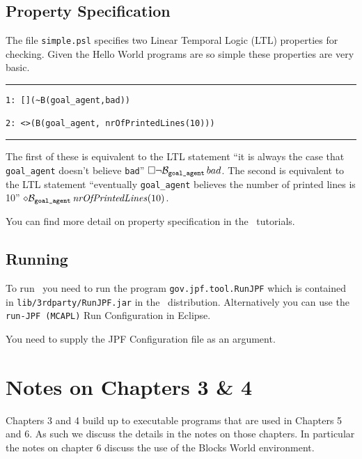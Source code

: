 \subsection{Property Specification}
The file \texttt{simple.psl} specifies two Linear Temporal Logic (LTL) properties for checking.  Given the Hello World programs are so simple these properties are very basic.  

\noindent\rule{\textwidth}{1pt}
\begin{small}
\begin{verbatim}
1: [](~B(goal_agent,bad))

2: <>(B(goal_agent, nrOfPrintedLines(10)))
\end{verbatim}
\end{small}
\rule{\textwidth}{1pt}

The first of these is equivalent to the LTL statement ``it is always the case that \texttt{goal\_agent} doesn't believe \texttt{bad}'' $\Box \neg \mathrm{{\cal B}}_{\texttt{goal\_agent}} \, bad$.  The second is equivalent to the LTL statement ``eventually \texttt{goal\_agent} believes the number of printed lines is 10'' $\diamond \mathrm{{\cal B}}_{\texttt{goal\_agent}} \, \mathit{nrOfPrintedLines}(10)$.

You can find more detail on property specification in the \ajpf\ tutorials.

\subsection{Running \ajpf}
To run \ajpf\ you need to run the program \texttt{gov.jpf.tool.RunJPF} which is contained in \texttt{lib/3rdparty/RunJPF.jar} in the \mcapl\ distribution.  Alternatively you can use the \texttt{run-JPF (MCAPL)} Run Configuration in Eclipse.

You need to supply the JPF Configuration file as an argument.  

\section{Notes on Chapters 3 \& 4}

Chapters 3 and 4 build up to executable programs that are used in Chapters 5 and 6.  As such we discuss the details in the notes on those chapters.  In particular the notes on chapter 6 discuss the use of the Blocks World environment.

